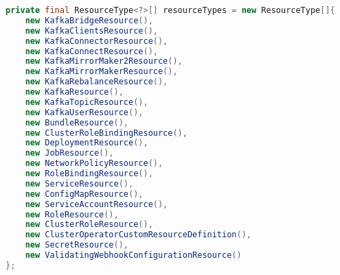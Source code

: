 \begin{lstlisting}[language=Java,label=resourcemanager:supported:resources,caption=List of supported resources inside ResourceManager,frame=tb]
private final ResourceType<?>[] resourceTypes = new ResourceType[]{
    new KafkaBridgeResource(),
    new KafkaClientsResource(),
    new KafkaConnectorResource(),
    new KafkaConnectResource(),
    new KafkaMirrorMaker2Resource(),
    new KafkaMirrorMakerResource(),
    new KafkaRebalanceResource(),
    new KafkaResource(),
    new KafkaTopicResource(),
    new KafkaUserResource(),
    new BundleResource(),
    new ClusterRoleBindingResource(),
    new DeploymentResource(),
    new JobResource(),
    new NetworkPolicyResource(),
    new RoleBindingResource(),
    new ServiceResource(),
    new ConfigMapResource(),
    new ServiceAccountResource(),
    new RoleResource(),
    new ClusterRoleResource(),
    new ClusterOperatorCustomResourceDefinition(),
    new SecretResource(),
    new ValidatingWebhookConfigurationResource()
};
\end{lstlisting}